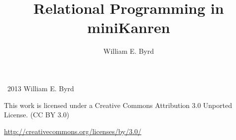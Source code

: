 \documentclass[onecolumn, 11pt, oneside, openright]{book}
\begin{document}
\begin{schemeregion}


\frontmatter

\VerbatimFootnotes

\title{\thesistitle{}}

\author{\thesisauthor{}}

\thispagestyle{empty}


\title{Relational Programming in miniKanren}
\author{William E. Byrd}
\maketitle

\newpage
\thispagestyle{empty}
\large
\noindent
\textcopyright~2013 William E. Byrd

\vspace{5mm}

\huge
\noindent
\ccLogo
\ccAttribution

\vspace{2mm}

\large
\noindent
This work is licensed under a Creative Commons Attribution 3.0 Unported License.
(CC BY 3.0)

\noindent
\url{http://creativecommons.org/licenses/by/3.0/}
\normalsize





{
\setcounter{tocdepth}{1}
\setlength{\parskip}{0pt}
\tableofcontents
}

\newpage

\mainmatter




\appendix

\end{schemeregion}
\end{document}
